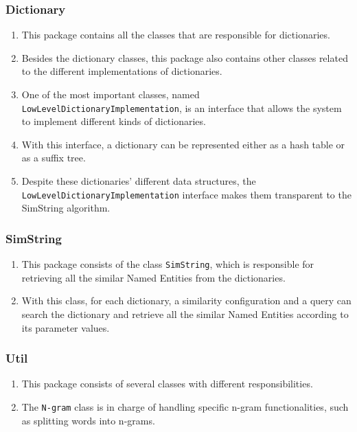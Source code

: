 \subsubsection*{Dictionary}
\begin{enumerate}[-]
	\item This package contains all the classes that are responsible for dictionaries.
	\item Besides the dictionary classes, this package also contains other classes related to the different implementations of dictionaries.
	\item One of the most important classes, named \texttt{LowLevelDictionaryImplementation}, is an interface that allows the system to implement different kinds of dictionaries.
	\item With this interface, a dictionary can be represented either as a hash table or as a suffix tree.
	\item Despite these dictionaries' different data structures, the \texttt{LowLevelDictionaryImplementation} interface makes them transparent to the SimString algorithm.
\end{enumerate}

\subsubsection*{SimString}
\begin{enumerate}[-]
	\item This package consists of the class \texttt{SimString}, which is responsible for retrieving all the similar Named Entities from the dictionaries. 
	\item With this class, for each dictionary, a similarity configuration and a query can search the dictionary and retrieve all the similar Named Entities according to its parameter values.
\end{enumerate}

\subsubsection*{Util}
\begin{enumerate}[-]
	\item This package consists of several classes with different responsibilities.
	\item The \texttt{N-gram} class is in charge of handling specific n-gram functionalities, such as splitting words into n-grams.
\end{enumerate}

